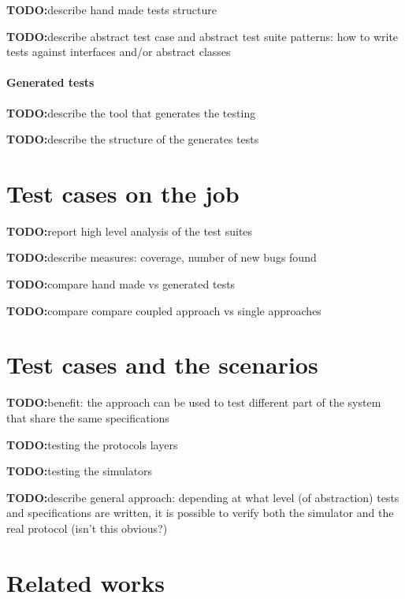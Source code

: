 \documentclass{article}
\newcommand{\todo}{\textbf{TODO:}}
\begin{document}
\todo describe hand made tests structure

\todo describe abstract test case and abstract test suite patterns: how to 
write tests against interfaces and/or abstract classes

\paragraph*{Generated tests}

\todo describe the tool that generates the testing

\todo describe the structure of the generates tests


\section{Test cases on the job}
\label{sec:test_cases_on_the_job}

\todo report high level analysis of the test suites

\todo describe measures: coverage, number of new bugs found

\todo compare hand made vs generated tests

\todo compare compare coupled approach vs single approaches


\section{Test cases and the scenarios}
\label{sec:test_cases_and_the_scenarios}

\todo benefit: the approach can be used to test different part of the system
that share the same specifications

\todo testing the protocols layers

\todo testing the simulators

\todo describe general approach: depending at what level (of abstraction) tests 
and specifications are written, it is possible to verify both the simulator and 
the real protocol (isn't this obvious?)


\section{Related works}
\label{sec:related_works}
\end{document}
